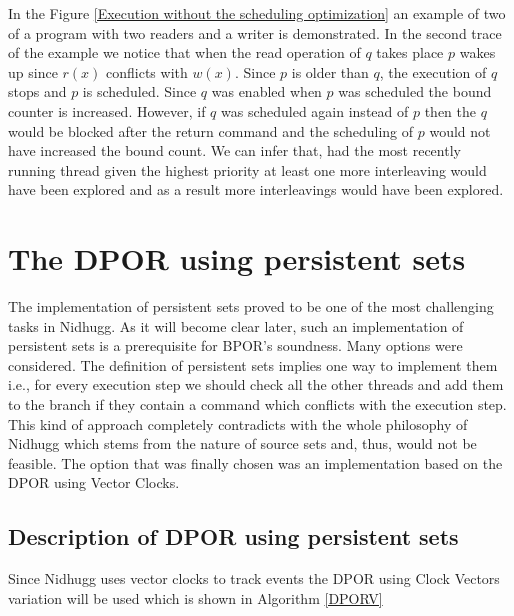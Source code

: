 In the Figure \ref{Execution without the scheduling optimization} an example of two of a program with two readers and a writer is demonstrated.
In the second trace of the example we notice that when the read operation of $q$ takes place $p$ wakes up since $r(x)$ conflicts with $w(x)$. Since $p$
is older than $q$, the execution of $q$ stops and $p$ is scheduled. Since $q$ was enabled when $p$ was scheduled the bound counter is increased. However,
if $q$ was scheduled again instead of $p$ then the $q$ would be blocked after the return command and the scheduling of $p$ would not have increased the 
bound count. We can infer that, had the most recently running thread given the highest priority at least one more interleaving would have
been explored and as a result more interleavings would have been explored.

\section{The DPOR using persistent sets}

The implementation of persistent sets proved to be one of the most challenging tasks in Nidhugg. As it will become clear later, such an implementation
of persistent sets is a prerequisite for BPOR's soundness. Many options were considered. The definition of persistent sets implies one 
way to implement them i.e., for every execution step we should
check all the other threads and add them to the branch if they contain a command which conflicts with the execution step. This kind of approach
completely contradicts with the whole philosophy of Nidhugg which stems from the nature of source sets and, thus, would not be feasible. 
The option that was finally chosen was an implementation based on the DPOR using Vector Clocks.

\subsection{Description of DPOR using persistent sets}

Since Nidhugg uses vector clocks to track events the DPOR using Clock Vectors variation will be used which is shown in Algorithm \ref{DPORV}

